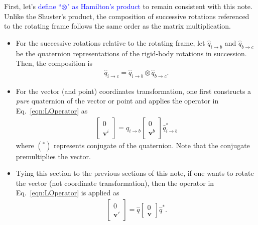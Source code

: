 First, let's \textcolor{blue}{define ``$\otimes$" as Hamilton's product} to remain consistent with this note. Unlike the Shuster's product, the composition of successive rotations referenced to the rotating frame follows the same order as the matrix multiplication.
\begin{itemize}
    \item For the successive rotations relative to the rotating frame, let $\hat{q}_{i \rightarrow b}$ and $\hat{q}_{b \rightarrow c}$ be the quaternion representations of the rigid-body rotations in succession. Then, the composition is
    \begin{align}
        \hat{q}_{i \rightarrow c} = \hat{q}_{i \rightarrow b} \otimes \hat{q}_{b \rightarrow c}.
    \end{align}
    \item For the vector (and point) coordinates transformation, one first constructs a \textit{pure} quaternion of the vector or point and applies the operator in Eq.~\ref{eqn:LOperator} as
    \begin{align}
        \begin{bmatrix}
            0 \\
            \boldsymbol{v}^i
        \end{bmatrix}
        =
        \hat{q}_{i \rightarrow b}
        \begin{bmatrix}
            0 \\
            \boldsymbol{v}^b
        \end{bmatrix}
        \hat{q}^{*}_{i \rightarrow b}
    \end{align}
    where $({}^*)$ represents conjugate of the quaternion. Note that the conjugate premultiplies the vector.
    \item Tying this section to the previous sections of this note, if one wants to rotate the vector (not coordinate transformation), then the operator in Eq.~\ref{eqn:LOperator} is applied as
    \begin{align}
        \begin{bmatrix}
            0 \\
            \boldsymbol{v}'
        \end{bmatrix}
        =
        \hat{q}
        \begin{bmatrix}
            0 \\
            \boldsymbol{v}
        \end{bmatrix}
        \hat{q}^* .
    \end{align}
\end{itemize}

